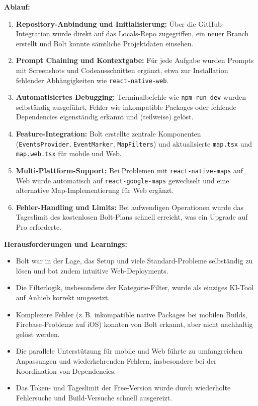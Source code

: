 \textbf{Ablauf:}
\begin{enumerate}
    \item \textbf{Repository-Anbindung und Initialisierung:} Über die GitHub-Integration wurde direkt auf das Locals-Repo zugegriffen, ein neuer Branch erstellt und Bolt konnte sämtliche Projektdaten einsehen.
    \item \textbf{Prompt Chaining und Kontextgabe:} Für jede Aufgabe wurden Prompts mit Screenshots und Codeausschnitten ergänzt, etwa zur Installation fehlender Abhängigkeiten wie \texttt{react-native-web}.
    \item \textbf{Automatisiertes Debugging:} Terminalbefehle wie \texttt{npm run dev} wurden selbständig ausgeführt, Fehler wie inkompatible Packages oder fehlende Dependencies eigenständig erkannt und (teilweise) gelöst.
    \item \textbf{Feature-Integration:} Bolt erstellte zentrale Komponenten (\texttt{EventsProvider}, \texttt{EventMarker}, \texttt{MapFilters}) und aktualisierte \texttt{map.tsx} und \texttt{map.web.tsx} für mobile und Web.
    \item \textbf{Multi-Plattform-Support:} Bei Problemen mit \texttt{react-native-maps} auf Web wurde automatisch auf \texttt{react-google-maps} gewechselt und eine alternative Map-Implementierung für Web ergänzt.
    \item \textbf{Fehler-Handling und Limits:} Bei aufwendigen Operationen wurde das Tageslimit des kostenlosen Bolt-Plans schnell erreicht, was ein Upgrade auf Pro erforderte.
\end{enumerate}

\textbf{Herausforderungen und Learnings:}
\begin{itemize}
    \item Bolt war in der Lage, das Setup und viele Standard-Probleme selbständig zu
          lösen und bot zudem intuitive Web-Deployments.
    \item Die Filterlogik, insbesondere der Kategorie-Filter, wurde als einziges KI-Tool
          auf Anhieb korrekt umgesetzt.
    \item Komplexere Fehler (z.\,B. inkompatible native Packages bei mobilen Builds,
          Firebase-Probleme auf iOS) konnten von Bolt erkannt, aber nicht nachhaltig
          gelöst werden.
    \item Die parallele Unterstützung für mobile und Web führte zu umfangreichen
          Anpassungen und wiederkehrenden Fehlern, insbesondere bei der Koordination von
          Dependencies.
    \item Das Token- und Tageslimit der Free-Version wurde durch wiederholte Fehlersuche
          und Build-Versuche schnell ausgereizt.
\end{itemize}

